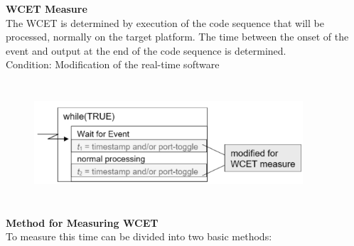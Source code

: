 {\rot\bf WCET Measure}\\

The WCET is determined by execution of the code sequence that will be processed, normally on the target platform. The time between the onset of the event and output at the end of the code sequence is determined.\\
 
Condition: Modification of the real-time software

	\begin{figure}[h]
    \centering
    \includegraphics[width=10cm, height=4.5cm]{Images/image76.png}
    \label{fig:Fig 22}
    \end{figure}

\textbf{Method for Measuring WCET}\\

To measure this time can be divided into two basic methods:


